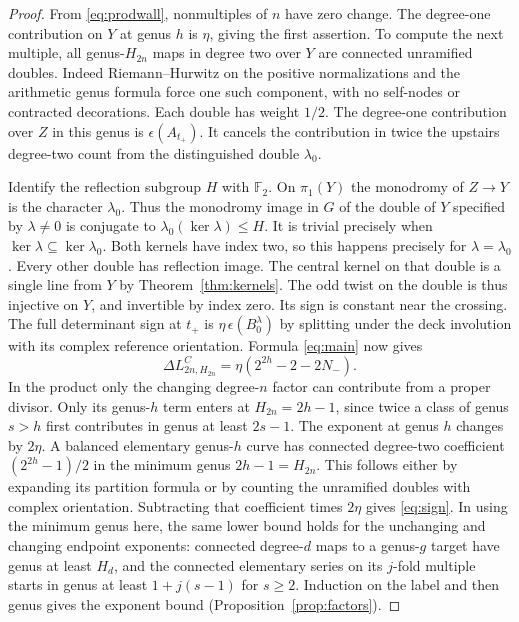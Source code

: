 \begin{proof}
From \eqref{eq:prodwall}, nonmultiples of $n$ have zero change.
The degree-one contribution on $Y$ at genus $h$ is $\eta$, giving
the first assertion. To compute the next multiple, all genus-$H_{2n}$
maps in degree two over $Y$ are connected unramified doubles. Indeed
Riemann--Hurwitz on the positive normalizations and the arithmetic
genus formula force one such component, with no self-nodes or
contracted decorations. Each double has weight $1/2$. The
degree-one contribution over $Z$ in this genus is $\epsilon(A_{t_+})$.
It cancels the contribution in twice the upstairs degree-two count
from the distinguished double $\lambda_0$.

Identify the reflection subgroup $H$ with $\mathbb F_2$. On
$\pi_1(Y)$ the monodromy of $Z\to Y$ is the character $\lambda_0$.
Thus the monodromy image in $G$ of the double of $Y$ specified by
$\lambda\ne0$ is conjugate to $\lambda_0(\ker\lambda)\le H$. It is
trivial precisely when $\ker\lambda\subseteq\ker\lambda_0$.
Both kernels have index two, so this happens precisely for
$\lambda=\lambda_0$. Every other double has reflection image.
The central kernel
on that double is a single line from $Y$ by
Theorem~\ref{thm:kernels}. The odd twist on the double is thus
injective on $Y$, and invertible by index zero. Its sign is constant
near the crossing. The full determinant sign at $t_+$ is
$\eta\,\epsilon(B_0^\lambda)$ by splitting under the deck
involution with its complex reference orientation. Formula
\eqref{eq:main} now gives
\[
      \Delta L^C_{2n,H_{2n}}
                   =\eta(2^{2h}-2-2N_-).
\]
In the product only the changing degree-$n$ factor can contribute
from a proper divisor. Only its genus-$h$ term enters at
$H_{2n}=2h-1$, since twice a class of genus $s>h$ first contributes
in genus at least $2s-1$. The exponent at genus $h$ changes by
$2\eta$. A balanced elementary genus-$h$ curve has connected
degree-two coefficient $(2^{2h}-1)/2$ in the
minimum genus $2h-1=H_{2n}$. This follows either by expanding its
partition formula \cite[Corollaries~7.2 and~7.3]{bp08} or by counting the
unramified doubles with complex orientation. Subtracting that
coefficient times $2\eta$ gives \eqref{eq:sign}. In using the
minimum genus here, the same lower bound holds for the unchanging
and changing endpoint exponents: connected degree-$d$ maps to
a genus-$g$ target have genus at least $H_d$, and the connected
elementary series on its $j$-fold multiple starts in genus at least
$1+j(s-1)$ for $s\ge2$. Induction on the label and then genus gives
the exponent bound (Proposition~\ref{prop:factors}).
\end{proof}

